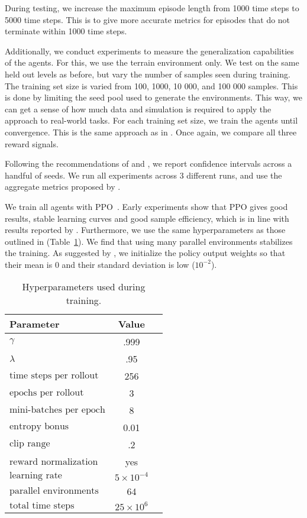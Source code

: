 During testing, we increase the maximum episode length from 1000 time steps to 5000 time steps.
This is to give more accurate metrics for episodes that do not terminate within 1000 time steps. 

Additionally, we conduct experiments to measure the generalization capabilities of the agents.
For this, we use the terrain environment only.
We test on the same held out levels as before, but vary the number of samples seen during training.
The training set size is varied from 100, 1000, 10 000, and 100 000 samples.
This is done by limiting the seed pool used to generate the environments.
This way, we can get a sense of how much data and simulation is required to apply the approach to real-world tasks.
For each training set size, we train the agents until convergence.
This is the same approach as in \cite{cobbe_procgen_2020}.
Once again, we compare all three reward signals.

Following the recommendations of \cite{henderson_matters_2018} and \cite{agarwal_rlliable_2022}, we report confidence intervals across a handful of seeds.
We run all experiments across 3 different runs, and use the aggregate metrics proposed by \cite{agarwal_rlliable_2022}.

We train all agents with PPO~\cite{schulman_ppo_2017}.
Early experiments show that PPO gives good results, stable learning curves and good sample efficiency, which is in line with results reported by \cite{andrychowicz_empirical_2020}.
Furthermore, we use the same hyperparameters as those outlined in \cite{cobbe_procgen_2020} (Table~\ref{tab:hyperparameters}).
We find that using many parallel environments stabilizes the training.
As suggested by \cite{andrychowicz_empirical_2020}, we initialize the policy output weights so that their mean is 0 and their standard deviation is low (\(10^{-2}\)).

\begin{table}
    \centering
    \caption{Hyperparameters used during training.}
    \begin{tabular}{lcc}
        \toprule
        \textbf{Parameter} & \textbf{Value} \\
        \midrule
        \(\gamma\) & .999 \\
        \(\lambda\) & .95 \\
        \(\text{time steps per rollout}\) & 256 \\
        \(\text{epochs per rollout}\) & 3 \\
        \(\text{mini-batches per epoch}\) & 8 \\
        \(\text{entropy bonus}\) & 0.01 \\
        \(\text{clip range}\) & .2 \\
        \(\text{reward normalization}\) & yes \\
        \(\text{learning rate}\) & \(5 \times 10^{-4}\) \\
        \(\text{parallel environments}\) & 64 \\
        \(\text{total time steps}\) & \(25 \times 10^6\) \\
        \bottomrule
    \end{tabular}
    \label{tab:hyperparameters}
\end{table}

